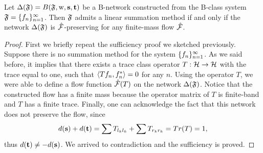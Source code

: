 \documentclass[12pt]{amsart}
\begin{document}
    \begin{theorem}
      \label{thm-graph-eq}
        Let $\net(\fsys) = B(\fsys, \wtp, \source, \sink)$ be a B-network constructed
          from the B-class system $\fsys = \seq{f}$.
        Then $\fsys$ admits a linear summation method if and only if
          the network $\net(\fsys)$ is $\flow$-preserving for any
          finite-mass flow $\flow$.
    \end{theorem}
    \begin{proof}
      First we briefly repeat the sufficiency proof we sketched previously.
      Suppose there is no summation method for the system $\seq{f}$.
      As we said before, it implies that there exists a trace class operator $T : \cal{H} \to \cal{H}$ with
      the trace equal to one, such that $\inner{Tf_n}{f_n^*} = 0$ for any $n$.
      Using the operator $T$, we were able to define a flow function $\flow(T)$ on the network
      $\net(\fsys)$.
      Notice that the constructed flow has a finite mass because the operator matrix of $T$ is finite-band and $T$ has a finite trace.
      Finally, one can acknowledge the fact that this network does not preserve the flow, since
      \[
        d(\source) + d(\sink) = \sum T_{l_k l_k} + \sum T_{r_k r_k} = Tr(T) = 1,
      \]
      thus $d(\sink) \neq -d(\source)$.
      We arrived to contradiction and the sufficiency is proved.


\end{proof}
\end{document}
